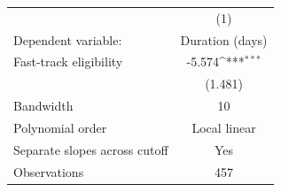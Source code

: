 {
\def\sym#1{\ifmmode^{#1}\else\(^{#1}\)\fi}
\begin{tabular}{lc}
\toprule
 & (1)\\
Dependent variable: & Duration (days)\\
\midrule
Fast-track eligibility&      -5.574\sym{***}\\
            &     (1.481)         \\
\midrule
Bandwidth   &          10         \\
Polynomial order&Local linear         \\
Separate slopes across cutoff&         Yes         \\
Observations&         457         \\
\bottomrule
\end{tabular}
}
